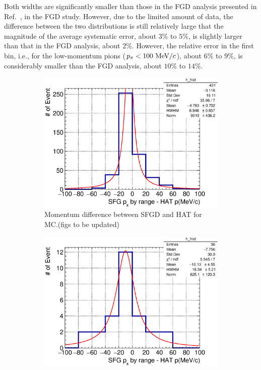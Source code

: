          Both widths are significantly smaller than those in the FGD analysis presented in Ref.~\cite{Jenkins:2022ljx}, in the FGD study.
          However, due to the limited amount of data, the difference between the two distributions is still relatively large that the magnitude of the average systematic error, about $3\%$ to $5\%$, is slightly larger than that in the FGD analysis, about $2\%$. 
          However, the relative error in the first bin, i.e., for the low-momentum pions ($p_{\pi}<100~\textrm{MeV}/c$), about $6\%$ to $9\%$, is considerably smaller than the FGD analysis, about $10\%$ to $14\%$.
          \begin{figure}[h]
          \centering
          \begin{subfigure}[h]{\dbfigwid\textwidth}
          \centering
          \includegraphics[width=\textwidth]{figures/sel/sspi_TOP_pi_mombr_hatp_difhist_al6_mc.eps}
          \caption{Momentum difference between SFGD and HAT for MC.(figs to be updated)}
          \label{subfig:sfgp-hatp-dif-mc}
          \end{subfigure}
          \hfill
          \begin{subfigure}[h]{\dbfigwid\textwidth}
          \centering
          \includegraphics[width=\textwidth]{figures/sel/sspi_TOP_pi_mombr_hatp_difhist_al4_CombHAT_data.eps}

\end{subfigure}
\end{figure}
